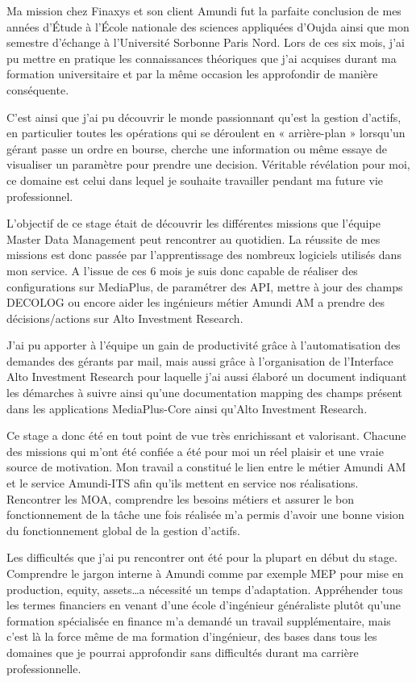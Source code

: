 \par Ma mission chez Finaxys et son client Amundi fut la parfaite conclusion de mes années d’Étude à l'École nationale des sciences appliquées d'Oujda ainsi que mon semestre d'échange à l’Université Sorbonne Paris Nord. Lors de ces six mois, j’ai pu mettre en pratique les connaissances théoriques que j’ai acquises durant ma formation universitaire et par la même occasion les approfondir de manière conséquente.
\par C’est ainsi que j’ai pu découvrir le monde passionnant qu’est la gestion d’actifs, en particulier toutes les opérations qui se déroulent en « arrière-plan » lorsqu'un gérant passe un ordre en bourse, cherche une information ou même essaye de visualiser un paramètre pour prendre une decision. Véritable révélation pour moi, ce domaine est celui dans lequel je souhaite travailler pendant ma future vie professionnel.
\par L’objectif de ce stage était de découvrir les différentes missions que l’équipe Master Data Management peut rencontrer au quotidien. La réussite de mes missions est donc passée par l’apprentissage des nombreux logiciels utilisés dans mon service. A l’issue de ces 6 mois je suis donc capable de réaliser des configurations sur MediaPlus, de paramétrer des API, mettre à jour des champs DECOLOG ou encore aider les ingénieurs métier Amundi AM a prendre des décisions/actions sur Alto Investment Research. 
\par J’ai pu apporter à l’équipe un gain de productivité grâce à l’automatisation des demandes des gérants par mail, mais aussi grâce à l’organisation de l'Interface Alto Investment Research pour laquelle j’ai aussi élaboré un document indiquant les démarches à suivre ainsi qu'une documentation mapping des champs présent dans les applications MediaPlus-Core ainsi qu'Alto Investment Research.
\par Ce stage a donc été en tout point de vue très enrichissant et valorisant. Chacune des missions qui m’ont été confiée a été pour moi un réel plaisir et une vraie source de motivation. Mon travail a constitué le lien entre le métier Amundi AM et le service Amundi-ITS afin qu’ils mettent en service nos réalisations. Rencontrer les MOA, comprendre les besoins métiers et assurer le bon fonctionnement de la tâche une fois réalisée m’a permis d’avoir une bonne vision du fonctionnement global de la gestion d’actifs.
\par Les difficultés que j'ai pu rencontrer ont été pour la plupart en début du stage. Comprendre le jargon interne à Amundi comme par exemple MEP pour mise en production, equity, assets\dots a nécessité un temps d'adaptation. Appréhender tous les termes financiers en venant d’une école d’ingénieur généraliste plutôt qu'une formation spécialisée en finance m'a demandé un travail supplémentaire, mais c'est là la force même de ma formation d'ingénieur, des bases dans tous les domaines que je pourrai approfondir sans difficultés durant ma carrière professionnelle. 
